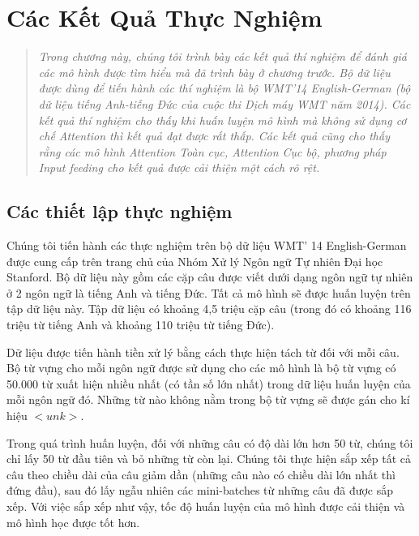 \chapter{Các Kết Quả Thực Nghiệm}
\ifpdf
    \graphicspath{{Chapter4/Chapter4Figs/PNG/}{Chapter4/Chapter4Figs/PDF/}{Chapter4/Chapter4Figs/}}
\else
    \graphicspath{{Chapter4/Chapter4Figs/EPS/}{Chapter4/Chapter4Figs/}}
\fi
\label{chap_4}
\begin{quote}
\textit{Trong chương này, chúng tôi trình bày các kết quả thí nghiệm để đánh giá các mô hình được tìm hiểu mà đã trình bày ở chương trước. Bộ dữ liệu được dùng để tiến hành các thí nghiệm là bộ WMT'14 English-German (bộ dữ liệu tiếng Anh-tiếng Đức của cuộc thi Dịch máy WMT năm 2014). Các kết quả thí nghiệm cho thấy khi huấn luyện mô hình mà không sử dụng cơ chế Attention thì kết quả đạt được rất thấp. Các kết quả cũng cho thấy rằng các mô hình Attention Toàn cục, Attention Cục bộ, phương pháp Input feeding cho kết quả được cải thiện một cách rõ rệt.}
\end{quote}
\section{Các thiết lập thực nghiệm}
Chúng tôi tiến hành các thực nghiệm trên bộ dữ liệu WMT' 14 English-German được cung cấp trên trang chủ của Nhóm Xử lý Ngôn ngữ Tự nhiên Đại học Stanford. Bộ dữ liệu này gồm các cặp câu được viết dưới dạng ngôn ngữ tự nhiên ở 2 ngôn ngữ là tiếng Anh và tiếng Đức. Tất cả mô hình sẽ được huấn luyện trên tập dữ liệu này. Tập dữ liệu có khoảng 4,5 triệu cặp câu (trong đó có khoảng 116 triệu từ tiếng Anh và khoảng 110 triệu từ tiếng Đức).

Dữ liệu được tiến hành tiền xử lý bằng cách thực hiện tách từ đối với mỗi câu. Bộ từ vựng cho mỗi ngôn ngữ được sử dụng cho các mô hình là bộ từ vựng có 50.000 từ xuất hiện nhiều nhất (có tần số lớn nhất) trong dữ liệu huấn luyện của mỗi ngôn ngữ đó. Những từ nào không nằm trong bộ từ vựng sẽ được gán cho kí hiệu $<unk>$.

Trong quá trình huấn luyện, đối với những câu có độ dài lớn hơn 50 từ, chúng tôi chỉ lấy 50 từ đầu tiên và bỏ những từ còn lại. Chúng tôi thực hiện sắp xếp tất cả câu theo chiều dài của câu giảm dần (những câu nào có chiều dài lớn nhất thì đứng đầu), sau đó lấy ngẫu nhiên các mini-batches từ những câu đã được sắp xếp. Với việc sắp xếp như vậy, tốc độ huấn luyện của mô hình được cải thiện và mô hình học được tốt hơn.


